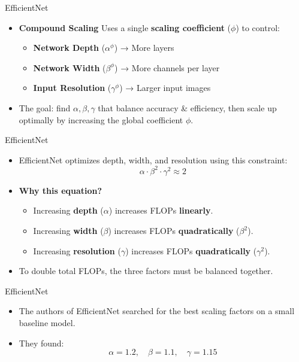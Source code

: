 \documentclass[10pt]{beamer}
\theoremstyle{remark}
\theoremstyle{definition}
\begin{document}
\begin{frame}{EfficientNet}
    \begin{itemize}
        \item \textbf{Compound Scaling} Uses a single \textbf{scaling coefficient} (\(\phi\)) to control:
        \begin{itemize}
        \item \textbf{Network Depth} (\(\alpha^\phi\)) → More layers
        \item \textbf{Network Width} (\(\beta^\phi\)) → More channels per layer
        \item \textbf{Input Resolution} (\(\gamma^\phi\)) → Larger input images
    \end{itemize}
        \item The goal: find \(\alpha, \beta, \gamma\) that balance accuracy \& efficiency, then scale up optimally by increasing the global coefficient \(\phi\).
    \end{itemize}

\end{frame}

\begin{frame}{EfficientNet}
\begin{itemize}
    \item EfficientNet optimizes depth, width, and resolution using this constraint:
    \[
    \alpha \cdot \beta^2 \cdot \gamma^2 \approx 2
    \]
    \item \textbf{Why this equation?}
    \begin{itemize}
        \item Increasing \textbf{depth} (\(\alpha\)) increases FLOPs \textbf{linearly}.
        \item Increasing \textbf{width} (\(\beta\)) increases FLOPs \textbf{quadratically} (\(\beta^2\)).
        \item Increasing \textbf{resolution} (\(\gamma\)) increases FLOPs \textbf{quadratically} (\(\gamma^2\)).
    \end{itemize}
    \item To double total FLOPs, the three factors must be balanced together.
\end{itemize}
\end{frame}



\begin{frame}{EfficientNet}
\begin{itemize}
    \item The authors of EfficientNet searched for the best scaling factors on a small baseline model.
    \item They found:
    \[
    \alpha = 1.2, \quad \beta = 1.1, \quad \gamma = 1.15
    \]
\end{itemize}
\end{frame}
\end{document}
